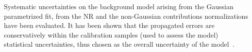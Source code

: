 Systematic uncertainties on the background model arising from the Gaussian parametrized fit, from the NR and the non-Gaussian contributions normalizations
have been evaluated. It has been shown that the propagated errors are conservatively within the calibration samples (used to assess the model) statistical uncertainties, 
thus  chosen as the overall uncertainty of the model~\cite{xe100_run_combination}. 
